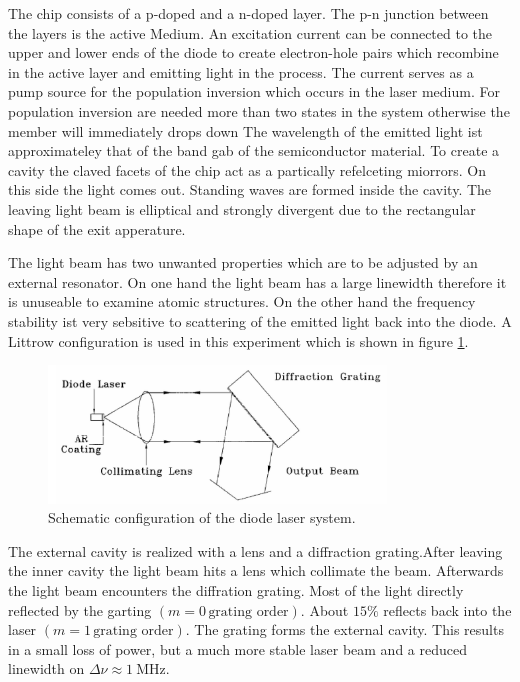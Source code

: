 The chip consists of a p-doped and a n-doped layer. The p-n junction between the layers is the active Medium.
An excitation current can be connected to the upper and lower ends of the diode to create electron-hole pairs which recombine in the active layer and
emitting light in the process. The current serves as a pump source for the population inversion which occurs in the laser medium.
For population inversion are needed more than two states in the system otherwise the member will immediately drops down 
The wavelength of the emitted light ist approximateley that of the band gab of the semiconductor material.
To create a cavity the claved facets of the chip act as a partically refelceting miorrors.
On this side the light comes out.
Standing waves are formed inside the cavity. The leaving light beam is elliptical and strongly divergent due to the  rectangular shape of the
exit apperature.

The light beam has two unwanted properties which are to be adjusted by an external resonator.
On one hand the light beam has a large linewidth therefore it is unuseable to examine atomic structures.
On the other hand the frequency stability ist very sebsitive to scattering of the emitted light back into the diode.
A Littrow configuration is used in this experiment which is shown in figure \ref{fig:configuration}. 

\begin{figure}[H]
    \centering
    \includegraphics[width=0.8\textwidth]{content/graphics/configuration.jpg}
    \caption{Schematic configuration of the diode laser system.} %
    \label{fig:configuration}
\end{figure}

The external cavity is realized with a lens and a diffraction grating.After leaving the inner cavity the light beam hits a lens which collimate the beam.
Afterwards the light beam encounters the diffration grating. Most of the light directly reflected by the garting  $\left(m = 0 \, \text{grating order}\right)$.
About $ 15 \% $ reflects back into the laser $\left(m = 1  \,\text{grating order}\right)$. The grating forms the external cavity.
This results in a small loss of power, but a much more stable laser beam and a reduced linewidth on $\Delta \nu \approx \qty{1}{\mega\hertz}$.

